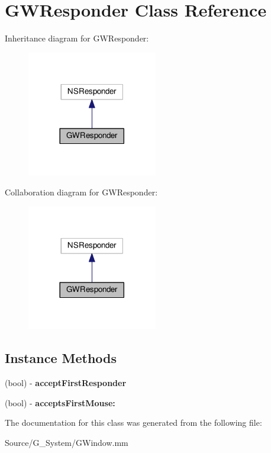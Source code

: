 \hypertarget{interfaceGWResponder}{}\section{G\+W\+Responder Class Reference}
\label{interfaceGWResponder}


Inheritance diagram for G\+W\+Responder\+:
\nopagebreak
\begin{figure}[H]
\begin{center}
\leavevmode
\includegraphics[width=161pt]{interfaceGWResponder__inherit__graph}
\end{center}
\end{figure}


Collaboration diagram for G\+W\+Responder\+:
\nopagebreak
\begin{figure}[H]
\begin{center}
\leavevmode
\includegraphics[width=161pt]{interfaceGWResponder__coll__graph}
\end{center}
\end{figure}
\subsection*{Instance Methods}
\begin{DoxyCompactItemize}
\item 
(bool) -\/ {\bfseries accept\+First\+Responder}\hypertarget{interfaceGWResponder_a71e98851ff4959a96d58f848ad2b882b}{}\label{interfaceGWResponder_a71e98851ff4959a96d58f848ad2b882b}

\item 
(bool) -\/ {\bfseries accepts\+First\+Mouse\+:}\hypertarget{interfaceGWResponder_a1360d3ea8830a6fc6bc3e5227d6990b0}{}\label{interfaceGWResponder_a1360d3ea8830a6fc6bc3e5227d6990b0}

\end{DoxyCompactItemize}


The documentation for this class was generated from the following file\+:\begin{DoxyCompactItemize}
\item 
Source/\+G\+\_\+\+System/G\+Window.\+mm\end{DoxyCompactItemize}
